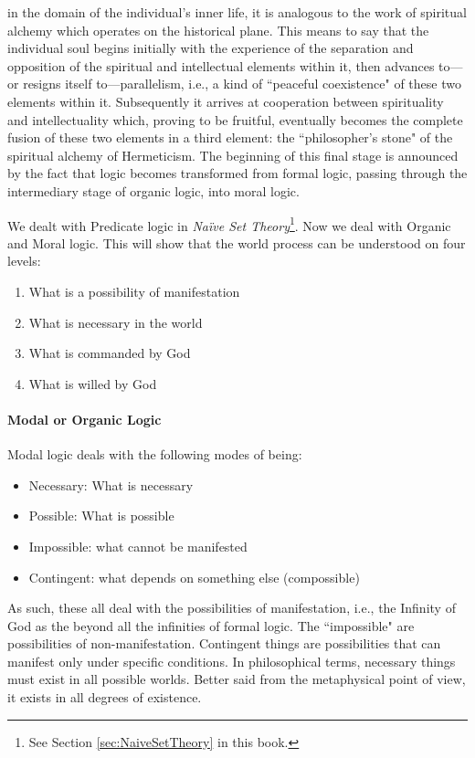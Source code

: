 \begin{quotex}
in the domain of the individual's inner life, it is analogous to the work of spiritual alchemy which operates on the historical plane. This means to say that the individual soul begins initially with the experience of the separation and opposition of the spiritual and intellectual elements within it, then advances to—or resigns itself to—parallelism, i.e., a kind of ``peaceful coexistence" of these two elements within it. Subsequently it arrives at cooperation between spirituality and intellectuality which, proving to be fruitful, eventually becomes the complete fusion of these two elements in a third element: the ``philosopher's stone" of the spiritual alchemy of Hermeticism. The beginning of this final stage is announced by the fact that logic becomes transformed from formal logic, passing through the intermediary stage of organic logic, into moral logic. 

\end{quotex}
We dealt with Predicate logic in \textit{Naïve Set Theory}\footnote{See Section \ref{sec:NaiveSetTheory} in this book.}. Now we deal with Organic and Moral logic. This will show that the world process can be understood on four levels:

\begin{enumerate}
\item What is a possibility of manifestation 
\item What is necessary in the world 
\item What is commanded by God 
\item What is willed by God 
\end{enumerate}
\paragraph{Modal or Organic Logic}
Modal logic deals with the following modes of being:

\begin{itemize}
\item Necessary: What is necessary 
\item Possible: What is possible 
\item Impossible: what cannot be manifested 
\item Contingent: what depends on something else (compossible) 
\end{itemize}
As such, these all deal with the possibilities of manifestation, i.e., the Infinity of God as the beyond all the infinities of formal logic. The ``impossible" are possibilities of non-manifestation. Contingent things are possibilities that can manifest only under specific conditions. In philosophical terms, necessary things must exist in all possible worlds. Better said from the metaphysical point of view, it exists in all degrees of existence.

